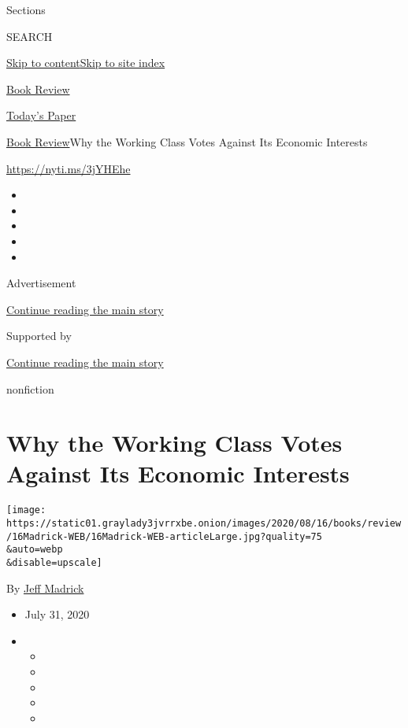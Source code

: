Sections

SEARCH

\protect\hyperlink{site-content}{Skip to
content}\protect\hyperlink{site-index}{Skip to site index}

\href{https://www.nytimes3xbfgragh.onion/section/books/review}{Book
Review}

\href{https://myaccount.nytimes3xbfgragh.onion/auth/login?response_type=cookie\&client_id=vi}{}

\href{https://www.nytimes3xbfgragh.onion/section/todayspaper}{Today's
Paper}

\href{/section/books/review}{Book Review}\textbar{}Why the Working Class
Votes Against Its Economic Interests

\url{https://nyti.ms/3jYHEhe}

\begin{itemize}
\item
\item
\item
\item
\item
\end{itemize}

Advertisement

\protect\hyperlink{after-top}{Continue reading the main story}

Supported by

\protect\hyperlink{after-sponsor}{Continue reading the main story}

nonfiction

\hypertarget{why-the-working-class-votes-against-its-economic-interests}{%
\section{Why the Working Class Votes Against Its Economic
Interests}\label{why-the-working-class-votes-against-its-economic-interests}}

\texttt{[image: https://static01.graylady3jvrrxbe.onion/images/2020/08/16/books/review/16Madrick-WEB/16Madrick-WEB-articleLarge.jpg?quality=75\\\&auto=webp\\\&disable=upscale]}

By \href{https://www.nytimes3xbfgragh.onion/by/jeff-madrick}{Jeff
Madrick}

\begin{itemize}
\item
  July 31, 2020
\item
  \begin{itemize}
  \item
  \item
  \item
  \item
  \item
  \end{itemize}
\end{itemize}

